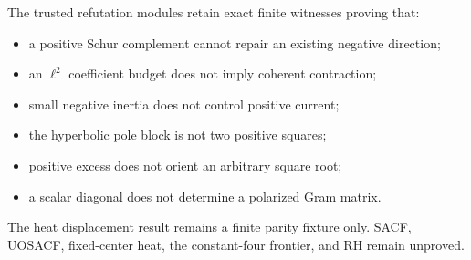 The trusted refutation modules retain exact finite witnesses proving that:
\begin{itemize}
\item a positive Schur complement cannot repair an existing negative direction;
\item an $\ell^2$ coefficient budget does not imply coherent contraction;
\item small negative inertia does not control positive current;
\item the hyperbolic pole block is not two positive squares;
\item positive excess does not orient an arbitrary square root;
\item a scalar diagonal does not determine a polarized Gram matrix.
\end{itemize}

The heat displacement result remains a finite parity fixture only.  SACF,
UOSACF, fixed-center heat, the constant-four frontier, and RH remain unproved.
